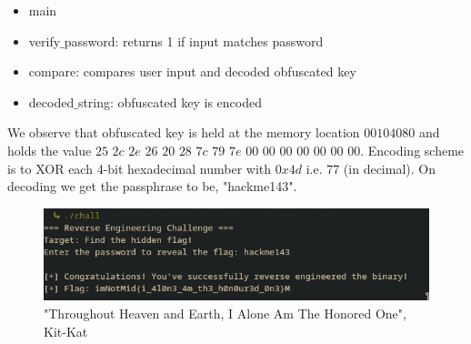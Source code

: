 \documentclass{article}
\begin{document}
\begin{itemize}
    \item main
    \item verify$\_$password: returns 1 if input matches password
    \item compare: compares user input and decoded obfuscated key
    \item decoded$\_$string: obfuscated key is encoded
\end{itemize}
We observe that obfuscated key is held at the memory location $00104080$ and holds the value $25$ $2c$ $2e$ $26$ $20$ $28$ $7c$ $79$ $7e$ $00$ $00$ $00$ $00$ $00$ $00$ $00$. Encoding scheme is to XOR each 4-bit hexadecimal number with $0x4d$ i.e. $77$ (in decimal). On decoding we get the passphrase to be, "hackme143". 
\begin{figure}[h!]
    \centering
    \includegraphics[width=1\linewidth]{figs/jjk4.png}
    \caption{"Throughout Heaven and Earth, I Alone Am The Honored One", Kit-Kat}
    \label{fig:enter-label}
\end{figure}
\end{document}
